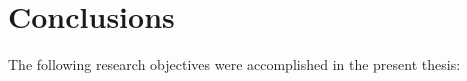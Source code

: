 \chapter{Conclusions}
The following research objectives were accomplished in the present thesis:

\blindenumerate[3]
